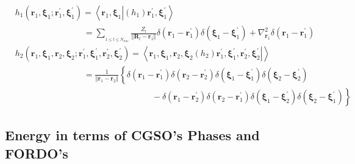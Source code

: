 \documentclass[aps,preprint]{revtex4}%
\begin{document}
\begin{align}
&  h_{1}\left(  \mathbf{r}_{1}\mathbf{,\xi}_{1};\mathbf{r}_{1}^{\prime
}\mathbf{,\xi}_{1}^{\prime}\right)  =\left\langle \mathbf{r}_{1}\mathbf{,\xi
}_{1}\left\vert \left(  h_{1}\right)  \mathbf{r}_{1}^{\prime}\mathbf{,\xi}%
_{1}^{\prime}\right.  \right\rangle \nonumber\\
&  \qquad\qquad\qquad\qquad\left.  =\right.  \sum_{_{1\leq l\leq N_{nuc}}%
}\frac{Z_{l}}{\left\Vert \mathbf{R}_{l}-\mathbf{r}_{1}\right\Vert }%
\delta\left(  \mathbf{r}_{1}-\mathbf{r}_{1}^{\prime}\right)  \delta\left(
\mathbf{\xi}_{1}-\mathbf{\xi}_{1}^{\prime}\right)  +\nabla_{\mathbf{r}_{1}%
}^{2}\delta\left(  \mathbf{r}_{1}-\mathbf{r}_{1}^{\prime}\right) \nonumber\\
&  h_{2}\left(  \mathbf{r}_{1}\mathbf{,\xi}_{1},\mathbf{r}_{2}\mathbf{,\xi
}_{2};\mathbf{r}_{1}^{\prime}\mathbf{,\xi}_{1}^{\prime},\mathbf{r}_{2}%
^{\prime}\mathbf{,\xi}_{2}^{\prime}\right)  =\left\langle \mathbf{r}%
_{1}\mathbf{,\xi}_{1},\mathbf{r}_{2}\mathbf{,\xi}_{2}\left.  \left(
h_{2}\right)  \mathbf{r}_{1}^{\prime}\mathbf{,\xi}_{1}^{\prime},\mathbf{r}%
_{2}^{\prime}\mathbf{,\xi}_{2}^{\prime}\right\vert \right\rangle \nonumber\\
&  \qquad\qquad\qquad\qquad\left.  =\right.  \frac{1}{\left\Vert
\mathbf{r}_{1}-\mathbf{r}_{2}\right\Vert }\left\{  \delta\left(
\mathbf{r}_{1}-\mathbf{r}_{1}^{\prime}\right)  \delta\left(  \mathbf{r}%
_{2}-\mathbf{r}_{2}^{\prime}\right)  \delta\left(  \mathbf{\xi}_{1}%
-\mathbf{\xi}_{1}^{\prime}\right)  \delta\left(  \mathbf{\xi}_{2}-\mathbf{\xi
}_{2}^{\prime}\right)  \right. \nonumber\\
&  \qquad\qquad\qquad\qquad\qquad\qquad\qquad\qquad-\left.  \delta\left(
\mathbf{r}_{1}-\mathbf{r}_{2}^{\prime}\right)  \delta\left(  \mathbf{r}%
_{2}-\mathbf{r}_{1}^{\prime}\right)  \delta\left(  \mathbf{\xi}_{1}%
-\mathbf{\xi}_{2}^{\prime}\right)  \delta\left(  \mathbf{\xi}_{2}-\mathbf{\xi
}_{1}^{\prime}\right)  \right\}
\end{align}


\subsection{Energy in terms of CGSO's Phases and FORDO's}
\end{document}
